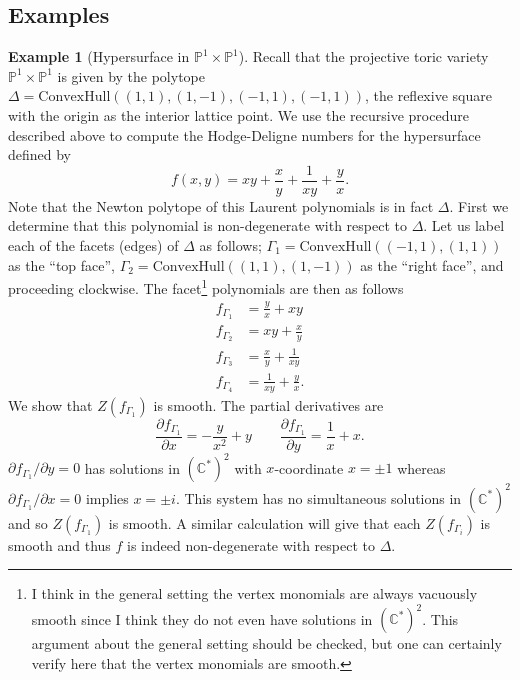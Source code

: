 \documentclass{article}
\theoremstyle{definition}
\newtheorem{example}[theorem]{Example}
\theoremstyle{remark}
\newcommand{\C}{\mathbb C}
\renewcommand{\P}{\mathbb P}
\begin{document}
\subsection{Examples}
\begin{example}[Hypersurface in $\P^1 \times \P^1$]
    Recall that the projective toric variety $\P^1 \times \P^1$ is
    given by the polytope $\Delta =
   \text{ConvexHull}((1,1), (1,-1), (-1, 1), (-1,1))$, 
    the reflexive square with the origin as the
    interior lattice point.
    We use the recursive procedure described above to compute the
    Hodge-Deligne numbers for the hypersurface defined by
    \[
        f(x,y) = xy + \frac{x}{y} + \frac{1}{xy} + \frac{y}{x}.
    \]
    Note that the Newton polytope of this Laurent polynomials is in
    fact $\Delta$.
    First we determine that this polynomial is non-degenerate with
    respect to $\Delta$. Let us label each of the facets (edges) of
    $\Delta$ as follows; $\Gamma_1 = \text{ConvexHull}((-1, 1), (1,1))$ as the
    ``top face'', $\Gamma_2 = \text{ConvexHull}((1,1), (1,-1))$ as the
    ``right face'', and proceeding clockwise.
    The facet\footnote{
    I think in the general setting the vertex monomials are always
    vacuously smooth since I think they do not even have solutions in
    $(\C^*)^2$. This argument about the general setting 
    should be checked, but one can certainly verify
    here that the vertex monomials are smooth.
    } polynomials are then as follows
    \begin{align*}
        f_{\Gamma_1} &= \frac{y}{x} + xy \\
        f_{\Gamma_2} &= xy + \frac{x}{y} \\
        f_{\Gamma_3} &= \frac{x}{y} + \frac{1}{xy}\\
        f_{\Gamma_4} &= \frac{1}{xy} + \frac{y}{x}.
    \end{align*}
    We show that $Z(f_{\Gamma_1})$ is smooth. The partial derivatives
    are
    \[
        \frac{\partial f_{\Gamma_1}}{\partial x} = -\frac{y}{x^2} + y
        \qquad
        \frac{\partial f_{\Gamma_1}}{\partial y} = \frac{1}{x} + x.
    \]
    $\partial f_{\Gamma_1}/\partial y = 0$ has solutions in $(\C^*)^2$
    with $x$-coordinate $x = \pm 1$
    whereas $\partial f_{\Gamma_1}/\partial x = 0$ implies $x = \pm
    i$. This system has no simultaneous solutions in $(\C^*)^2$ and so
    $Z(f_{\Gamma_1})$ is smooth.
    A similar calculation will give that each $Z(f_{\Gamma_i})$ is
    smooth and thus $f$ is indeed non-degenerate
    with respect to $\Delta$. 


\end{example}
\end{document}
